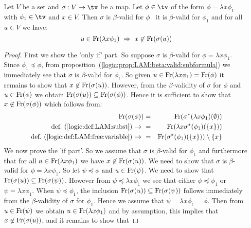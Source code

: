 \begin{prop}\label{logic:prop:LAM:beta:valid:recursion:lam}
    Let $V$ be a set and $\sigma:V\to\tv$ be a map. Let $\phi\in\tv$ 
    of the form $\phi=\lambda x\phi_{1}$ with $\phi_{1}\in\tv$ and $x\in V$. 
    Then $\sigma$ is $\beta$-valid for $\phi$ \ifand\ it is $\beta$-valid 
    for $\phi_{1}$ and for all $u\in V$ we have:
    \[
        u\in\free(\lambda x\phi_{1})\ \Rightarrow\ x\not\in\free(\sigma(u))
    \]
\end{prop}
\begin{proof}
    First we show the 'only if' part. So suppose $\sigma$ is $\beta$-valid
    for $\phi=\lambda x\phi_{1}$. Since $\phi_{1}\preceq\phi$, from
    proposition~(\ref{logic:prop:LAM:beta:valid:subformula}) we immediately
    see that $\sigma$ is $\beta$-valid for $\phi_{1}$. So given
    $u\in\mbox{\rm Fr}(\lambda x \phi_{1})=\mbox{\rm Fr}(\phi)$ it remains to show that
    $x\not\in\mbox{\rm Fr}(\sigma(u))$. However, from the $\beta$-validity of 
    $\sigma$ for $\phi$ and $u\in\mbox{\rm Fr}(\phi)$ we obtain
    $\mbox{\rm Fr}(\sigma(u))\subseteq\mbox{\rm Fr}(\sigma(\phi))$. Hence it is sufficient
    to show that $x\not\in\mbox{\rm Fr}(\sigma(\phi))$ which follows from:
    \begin{eqnarray*}
        \mbox{\rm Fr}(\sigma(\phi))
        &=&\mbox{\rm Fr}(\sigma^{*}(\lambda x\phi_{1})(\emptyset))\\
        \mbox{def.~(\ref{logic:def:LAM:subst})$\ \rightarrow\ $}
        &=&\mbox{\rm Fr}(\lambda x \sigma^{*}(\phi_{1})(\{x\}))\\
        \mbox{def.~(\ref{logic:def:LAM:free:variable})$\ \rightarrow\ $}
        &=&\mbox{\rm Fr}(\sigma^{*}(\phi_{1})(\{x\}))\setminus\{x\}
    \end{eqnarray*}
    We now prove the 'if part'. So we assume that $\sigma$ is $\beta$-valid
    for $\phi_{1}$ and furthermore that for all $u\in\mbox{\rm Fr}(\lambda x\phi_{1})$
    we have $x\not\in\mbox{\rm Fr}(\sigma(u))$. We need to show that $\sigma$ is 
    $\beta$-valid for $\phi=\lambda x\phi_{1}$. So let $\psi\preceq\phi$ and 
    $u\in\mbox{\rm Fr}(\psi)$. We need to show that 
    $\mbox{\rm Fr}(\sigma(u))\subseteq\mbox{\rm Fr}(\sigma(\psi))$. However from 
    $\psi\preceq\lambda x\phi_{1}$ we see that either $\psi\preceq\phi_{1}$
    or $\psi=\lambda x\phi_{1}$. When $\psi\preceq\phi_{1}$, the inclusion
    $\mbox{\rm Fr}(\sigma(u))\subseteq\mbox{\rm Fr}(\sigma(\psi))$ follows immediately
    from the $\beta$-validity of $\sigma$ for $\phi_{1}$. Hence we assume 
    that $\psi=\lambda x\phi_{1}=\phi$. Then from $u\in\mbox{\rm Fr}(\psi)$ we
    obtain $u\in\mbox{\rm Fr}(\lambda x\phi_{1})$ and by assumption, this implies
    that $x\not\in\mbox{\rm Fr}(\sigma(u))$, and it remains to show that 

\end{proof}
